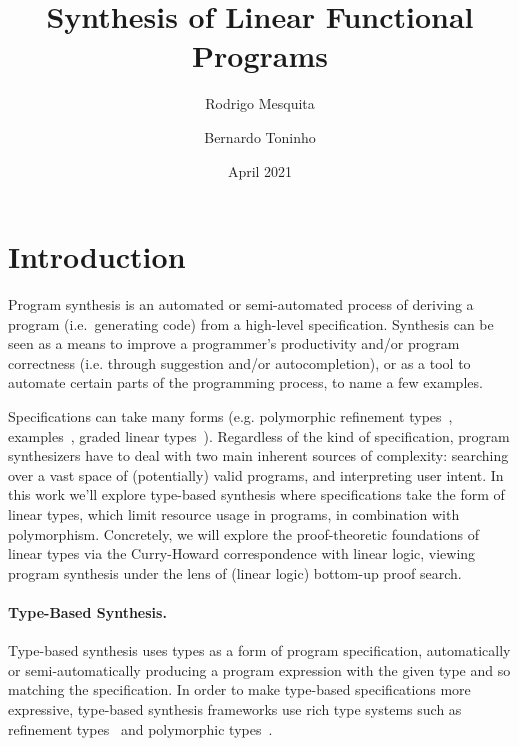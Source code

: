 \documentclass{llncs}
\title{Synthesis of Linear Functional Programs}
\author{Rodrigo Mesquita \and Bernardo Toninho}
\date{April 2021}
\institute{NOVA School of Science and Technology}
\newcommand{\mypara}[1]{\paragraph{\textbf{#1}.}}
\begin{document}
\maketitle

\section{Introduction}

Program synthesis is an automated or semi-automated process of deriving a
program (i.e.~generating code) from a high-level specification.
%
Synthesis can be seen as a means to improve a programmer's productivity and/or
program correctness (i.e. through suggestion and/or autocompletion), or as a
tool to automate certain parts of the programming process, to name a few
examples.

Specifications can take many forms (e.g.  polymorphic refinement
types~\cite{DBLP:conf/pldi/PolikarpovaKS16},
examples~\cite{DBLP:conf/popl/FrankleOWZ16}, graded linear
types~\cite{DBLP:conf/lopstr/HughesO20}).  Regardless of the kind of
specification, program synthesizers have to deal with two main inherent sources
of complexity: searching over a vast space of (potentially) valid programs, and
interpreting user intent.
%
In this work we'll explore type-based synthesis where specifications take the
form of linear types, which limit resource usage in programs, in combination
with polymorphism.  Concretely, we will explore the proof-theoretic foundations
of linear types via the Curry-Howard correspondence with linear logic, viewing
program synthesis under the lens of (linear logic) bottom-up proof search.

%

\mypara{Type-Based Synthesis}
Type-based synthesis uses types as a form of program specification,
automatically or semi-automatically producing a program expression
with the given type and so matching the specification.
%
In order to make type-based specifications more expressive, type-based
synthesis frameworks use rich type systems such as refinement
types~\cite{DBLP:conf/pldi/PolikarpovaKS16} and polymorphic types~\cite{DBLP:conf/pldi/PolikarpovaKS16}.
\end{document}

